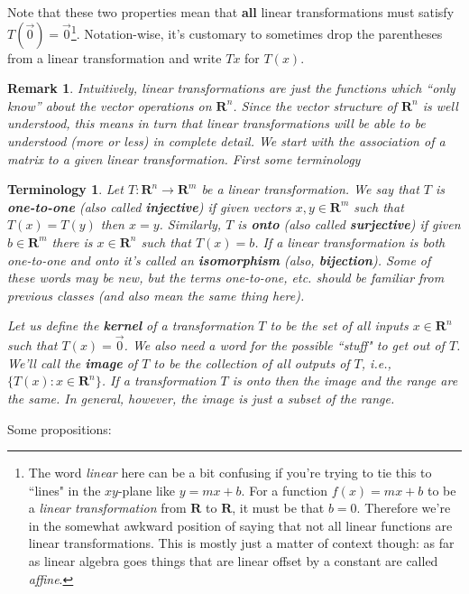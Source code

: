 \documentclass[12pt]{article}
\numberwithin{equation}{subsection}
\numberwithin{figure}{subsection}
\theoremstyle{note}
\newtheorem{remark}[subsection]{Remark}
\newtheorem{terminology}[subsection]{Terminology}
\begin{document}
Note that these two properties mean that \textbf{all} linear transformations must satisfy $T(\vec{0})=\vec{0}$\footnote{The word \textit{linear} here can be a bit confusing if you're trying to tie this to ``lines" in the $xy$-plane like $y=mx+b$. For a function $f(x)=mx+b$ to be a \textit{linear transformation} from $\mathbf{R}$ to $\mathbf{R}$, it must be that $b=0$. Therefore we're in the somewhat awkward position of saying that not all linear functions are linear transformations. This is mostly just a matter of context though: as far as linear algebra goes things that are linear offset by a constant are called \textit{affine}.}. Notation-wise, it's customary to sometimes drop the parentheses from a linear transformation and write $Tx$ for $T(x)$.
\begin{remark}
	Intuitively, linear transformations are just the functions which ``only know'' about the vector operations on $\mathbf{R}^n$. Since the vector structure of $\mathbf{R}^n$ is well understood, this means in turn that linear transformations will be able to be understood (more or less) in complete detail. We start with the association of a matrix to a given linear transformation. First some terminology
\end{remark}

\begin{terminology}
	Let $T\colon \mathbf{R}^n\to\mathbf{R}^m$ be a linear transformation. We say that $T$ is \textbf{one-to-one} (also called \textbf{injective}) if given vectors $x,y\in \mathbf{R}^m$ such that $T(x)=T(y)$ then $x=y$. Similarly, $T$ is \textbf{onto} (also called \textbf{surjective}) if given $b\in\mathbf{R}^m$ there is $x\in\mathbf{R}^n$ such that $T(x)=b$. If a linear transformation is both one-to-one and onto it's called an \textbf{isomorphism} (also, \textbf{bijection}). Some of these words may be new, but the terms \textit{one-to-one}, etc. should be familiar from previous classes (and also mean the same thing here). 
	
	Let us define the \textbf{kernel} of a transformation $T$ to be the set of all inputs $x\in\mathbf{R}^n$ such that $T(x)=\vec{0}$. We also need a word for the possible ``stuff" to get out of $T$. We'll call the \textbf{image} of $T$ to be the collection of all outputs of $T$, i.e., $\{T(x) : x\in \mathbf{R}^n\}$. If a transformation $T$ is onto then the image and the range are the same. In general, however, the image is just a subset of the range.
\end{terminology}

Some propositions:
\end{document}

